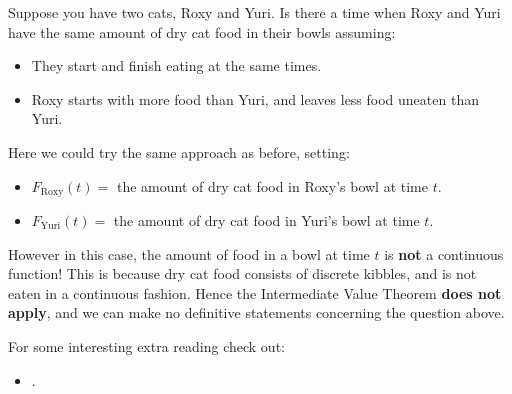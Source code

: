 \documentclass{ximera}
\begin{document}
\begin{example}
Suppose you have two cats, Roxy and Yuri. Is there a time when Roxy
and Yuri have the same amount of dry cat food in their bowls assuming:
  \begin{itemize}
  \item They start and finish eating at the same times.
  \item Roxy starts with more food than Yuri, and leaves less food
    uneaten than Yuri.
  \end{itemize}

\begin{explanation} 
  Here we could try the same approach as before, setting:
  \begin{itemize}
    \item $F_{\mathrm{Roxy}}(t) =$ the amount of dry cat food in Roxy's bowl at time $t$.
    \item $F_{\mathrm{Yuri}}(t) =$ the amount of dry cat food in Yuri's bowl at time $t$.
  \end{itemize}
  However in this case, the amount of food in a bowl at time $t$ is
  \textbf{not} a continuous function! This is because dry cat food
  consists of discrete kibbles, and is not eaten in a continuous
  fashion. Hence the Intermediate Value Theorem \textbf{does not
    apply}, and we can make no definitive statements concerning the
  question above.
\end{explanation}
\end{example}


For some interesting extra reading check out:
\begin{itemize}
\item {}.
\end{itemize}
\end{document}
